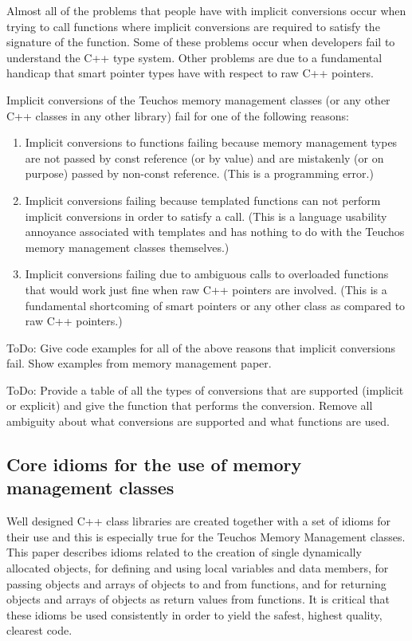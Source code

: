 \documentclass[pdf,ps2pdf,11pt]{SANDreport}
\begin{document}
Almost all of the problems that people have with implicit conversions
occur when trying to call functions where implicit conversions are
required to satisfy the signature of the function.  Some of these
problems occur when developers fail to understand the C++ type system.
Other problems are due to a fundamental handicap that smart pointer
types have with respect to raw C++ pointers.

Implicit conversions of the Teuchos memory management classes (or any
other C++ classes in any other library) fail for one of the following
reasons:

\begin{enumerate}

{}\item{}Implicit conversions to functions failing because memory
management types are not passed by const reference (or by value) and
are mistakenly (or on purpose) passed by non-const reference. (This is
a programming error.)

{}\item{}Implicit conversions failing because templated functions can
not perform implicit conversions in order to satisfy a call. (This is
a language usability annoyance associated with templates and has
nothing to do with the Teuchos memory management classes themselves.)

{}\item{}Implicit conversions failing due to ambiguous calls to
overloaded functions that would work just fine when raw C++ pointers
are involved. (This is a fundamental shortcoming of smart pointers or
any other class as compared to raw C++ pointers.)

\end{enumerate}

ToDo: Give code examples for all of the above reasons that implicit
conversions fail.  Show examples from memory management paper.

ToDo: Provide a table of all the types of conversions that are
supported (implicit or explicit) and give the function that performs
the conversion.  Remove all ambiguity about what conversions are
supported and what functions are used.

%
{}\subsection{Core idioms for the use of memory management classes}
\label{sec:idioms}
%

Well designed C++ class libraries are created together with a set of
idioms for their use and this is especially true for the Teuchos
Memory Management classes.  This paper describes idioms related to the
creation of single dynamically allocated objects, for defining and
using local variables and data members, for passing objects and arrays
of objects to and from functions, and for returning objects and arrays
of objects as return values from functions.  It is critical that these
idioms be used consistently in order to yield the safest, highest
quality, clearest code.
\end{document}
